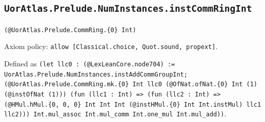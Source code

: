 \documentclass[11pt]{article}
\begin{document}
\subsection*{\texttt{UorAtlas.Prelude.NumInstances.instCommRingInt}}
\noindent\texttt{(@UorAtlas.Prelude.CommRing.\{0\} Int)}\par
\noindent Axiom policy: \texttt{allow [Classical.choice, Quot.sound, propext]}.\par
\noindent Defined as \texttt{(let llc0 : (@LexLeanCore.node704) := UorAtlas.Prelude.NumInstances.instAddCommGroupInt; (@UorAtlas.Prelude.CommRing.mk.\{0\} Int llc0 (@OfNat.ofNat.\{0\} Int (1) (@instOfNat (1))) (fun (llc1 : Int) => (fun (llc2 : Int) => (@HMul.hMul.\{0, 0, 0\} Int Int Int (@instHMul.\{0\} Int Int.instMul) llc1 llc2))) Int.mul\_assoc Int.mul\_comm Int.one\_mul Int.mul\_add))}.\par
\end{document}
